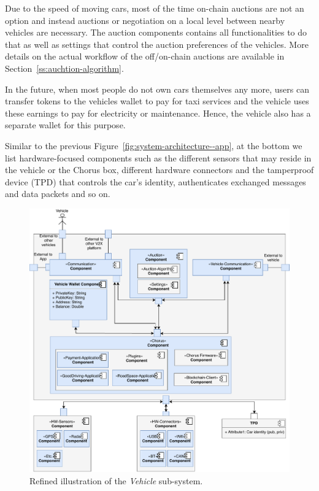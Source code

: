 \documentclass{llncs}
\begin{document}
{				Due to the speed of moving cars, most of the time on-chain auctions are not an option and instead auctions or negotiation on a local level between nearby vehicles are necessary. The auction components contains all functionalities to do that as well as settings that control the auction preferences of the vehicles. More details on the actual workflow of the off/on-chain auctions are available in Section~\ref{ss:auchtion-algorithm}.
							
				In the future, when most people do not own cars themselves any more, users can transfer tokens to the vehicles wallet to pay for taxi services and the vehicle uses these earnings to pay for electricity or maintenance. Hence, the vehicle also has a separate wallet for this purpose.
				
				Similar to the previous Figure~\ref{fig:system-architecture--app}, at the bottom we list hardware-focused components such as the different sensors that may reside in the vehicle or the Chorus box, different hardware connectors and the tamperproof device (TPD) that controls the car's identity, authenticates exchanged messages and data packets and so on.
				
				\begin{figure}
					\centering
					\includegraphics[scale=0.65]{Figures/longterm-architecture/20180507_Refined-sys-architecture--vehicle.pdf}
					\caption{Refined illustration of the \textit{Vehicle} sub-system.}	
					\label{fig:system-architecture--vehicle}
				\end{figure}
				
}
\end{document}
